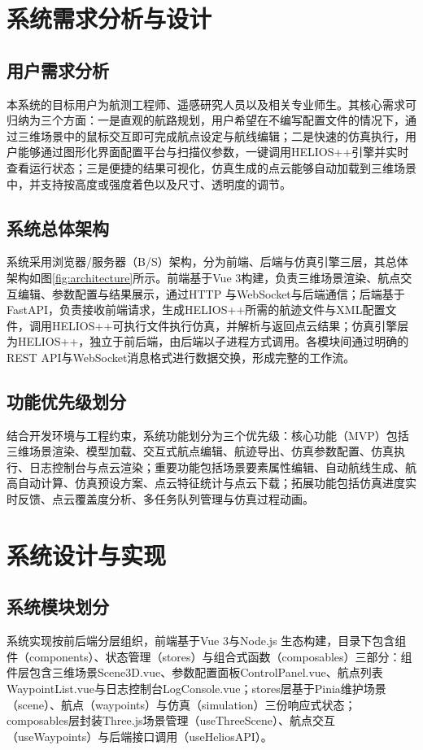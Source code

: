 \documentclass[a4paper,fleqn]{cas-sc}
\begin{document}
\section{系统需求分析与设计}\label{sec:design}

\subsection{用户需求分析}
本系统的目标用户为航测工程师、遥感研究人员以及相关专业师生。其核心需求可归纳为三个方面：一是直观的航路规划，用户希望在不编写配置文件的情况下，通过三维场景中的鼠标交互即可完成航点设定与航线编辑；二是快速的仿真执行，用户能够通过图形化界面配置平台与扫描仪参数，一键调用HELIOS++引擎并实时查看运行状态；三是便捷的结果可视化，仿真生成的点云能够自动加载到三维场景中，并支持按高度或强度着色以及尺寸、透明度的调节。

\subsection{系统总体架构}
系统采用浏览器/服务器（B/S）架构，分为前端、后端与仿真引擎三层，其总体架构如图\ref{fig:architecture}所示。前端基于Vue 3构建，负责三维场景渲染、航点交互编辑、参数配置与结果展示，通过HTTP \citep{rfc9110,rfc9113,rfc9114} 与WebSocket与后端通信；后端基于FastAPI，负责接收前端请求，生成HELIOS++所需的航迹文件与XML配置文件，调用HELIOS++可执行文件执行仿真，并解析与返回点云结果；仿真引擎层为HELIOS++，独立于前后端，由后端以子进程方式调用。各模块间通过明确的REST API与WebSocket消息格式进行数据交换，形成完整的工作流。

\subsection{功能优先级划分}
结合开发环境与工程约束，系统功能划分为三个优先级：核心功能（MVP）包括三维场景渲染、模型加载、交互式航点编辑、航迹导出、仿真参数配置、仿真执行、日志控制台与点云渲染；重要功能包括场景要素属性编辑、自动航线生成、航高自动计算、仿真预设方案、点云特征统计与点云下载；拓展功能包括仿真进度实时反馈、点云覆盖度分析、多任务队列管理与仿真过程动画。

\section{系统设计与实现}\label{sec:impl}

\subsection{系统模块划分}
系统实现按前后端分层组织，前端基于Vue 3与Node.js \citep{nodejs} 生态构建，目录下包含组件（components）、状态管理（stores）与组合式函数（composables）三部分：组件层包含三维场景Scene3D.vue、参数配置面板ControlPanel.vue、航点列表WaypointList.vue与日志控制台LogConsole.vue；stores层基于Pinia维护场景（scene）、航点（waypoints）与仿真（simulation）三份响应式状态；composables层封装Three.js场景管理（useThreeScene）、航点交互（useWaypoints）与后端接口调用（useHeliosAPI）。
\end{document}
